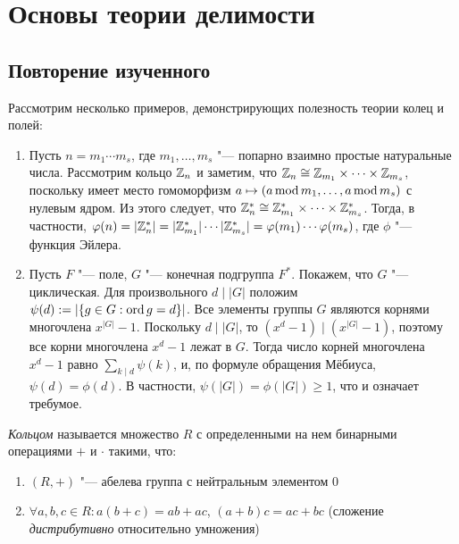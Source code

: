\section{Основы теории делимости}

\subsection{Повторение изученного}

\begin{example}
	Рассмотрим несколько примеров, демонстрирующих полезность теории колец и полей:
	\begin{enumerate}
		\item Пусть $n = m_1 \dotsm m_s$, где $m_1, \dotsc, m_s$ "--- попарно взаимно простые натуральные числа. Рассмотрим кольцо $\mathbb{Z}_n$ и заметим, что $\mathbb{Z}_n \cong \mathbb{Z}_{m_1} \times \dotsb \times \mathbb{Z}_{m_s}$, поскольку имеет место гомоморфизм $a \mapsto (a \operatorname{mod} m_1, \dotsc, a \operatorname{mod} m_s)$ с нулевым ядром. Из этого следует, что $\mathbb{Z}_n^* \cong \mathbb{Z}_{m_1}^* \times \dotsb \times \mathbb{Z}_{m_s}^*$. Тогда, в частности, $\phi(n) =  |\Z_n^*| \hm= |\Z_{m_1}^*|\dotsm|\Z_{m_s}^*| \hm= \phi(m_1)\dotsm\phi(m_s)$, где $\phi$ "--- функция Эйлера.
		\item Пусть $F$ "--- поле, $G$ "--- конечная подгруппа $F^*$. Покажем, что $G$ "--- циклическая. Для произвольного $d\mid |G|$ положим $\psi(d) := |\{g \in G: \operatorname{ord}{g} = d\}|$. Все элементы группы $G$ являются корнями многочлена $x^{|G|} - 1$. Поскольку $d\mid |G|$, то $(x^{d} - 1) \mid (x^{|G|} - 1)$, поэтому все корни многочлена $x^d - 1$ лежат в $G$. Тогда число корней многочлена $x^d - 1$ равно $\sum_{k \mid d} \psi(k)$, и, по формуле обращения Мёбиуса, $\psi(d) = \phi(d)$. В частности, $\psi(|G|) = \phi(|G|) \ge 1$, что и означает требумое.
	\end{enumerate}
\end{example}

\begin{definition}
	\textit{Кольцом} называется множество $R$ с определенными на нем бинарными операциями $+$ и $\cdot$ такими, что:
	\begin{enumerate}
		\item $(R, +)$ "--- абелева группа с нейтральным элементом 0
		\item $\forall a, b, c \in R: a(b + c) = ab + ac$, $(a + b)c = ac + bc$ (сложение \textit{дистрибутивно} относительно умножения)
	\end{enumerate}
\end{definition}

